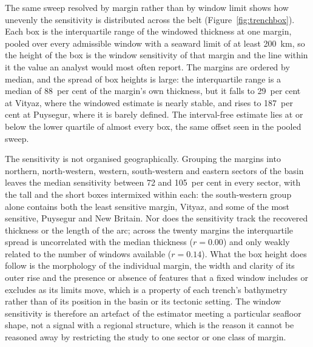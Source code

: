 \documentclass[final]{agujournal2019}
\begin{document}
The same sweep resolved by margin rather than by window limit shows how
unevenly the sensitivity is distributed across the belt
(Figure~\ref{fig:trenchbox}). Each box is the interquartile range of the
windowed thickness at one margin, pooled over every admissible window with a
seaward limit of at least 200~km, so the height of the box is the window
sensitivity of that margin and the line within it the value an analyst would
most often report. The margins are ordered by median, and the spread of box
heights is large: the interquartile range is a median of 88~per cent of the
margin's own thickness, but it falls to 29~per cent at Vityaz, where the
windowed estimate is nearly stable, and rises to 187~per cent at Puysegur,
where it is barely defined. The interval-free estimate lies at or below the
lower quartile of almost every box, the same offset seen in the pooled sweep.

The sensitivity is not organised geographically. Grouping the margins into
northern, north-western, western, south-western and eastern sectors of the
basin leaves the median sensitivity between 72 and 105~per cent in every
sector, with the tall and the short boxes intermixed within each: the
south-western group alone contains both the least sensitive margin, Vityaz, and
some of the most sensitive, Puysegur and New Britain. Nor does the sensitivity
track the recovered thickness or the length of the arc; across the twenty
margins the interquartile spread is uncorrelated with the median thickness
($r = 0.00$) and only weakly related to the number of windows available
($r = 0.14$). What the box height does follow is the morphology of the
individual margin, the width and clarity of its outer rise and the presence or
absence of features that a fixed window includes or excludes as its limits
move, which is a property of each trench's bathymetry rather than of its
position in the basin or its tectonic setting. The window sensitivity is
therefore an artefact of the estimator meeting a particular seafloor shape, not
a signal with a regional structure, which is the reason it cannot be reasoned
away by restricting the study to one sector or one class of margin.
\end{document}
